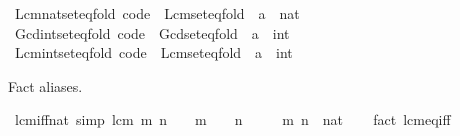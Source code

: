\begin{isabellebody}
\isamarkupfalse%
\ Lcm{\isacharunderscore}{\kern0pt}nat{\isacharunderscore}{\kern0pt}set{\isacharunderscore}{\kern0pt}eq{\isacharunderscore}{\kern0pt}fold\ {\isacharbrackleft}{\kern0pt}code{\isacharbrackright}{\kern0pt}\ {\isacharequal}{\kern0pt}\ Lcm{\isacharunderscore}{\kern0pt}set{\isacharunderscore}{\kern0pt}eq{\isacharunderscore}{\kern0pt}fold\ {\isacharbrackleft}{\kern0pt}\ {\isacharquery}{\kern0pt}{\isacharprime}{\kern0pt}a\ {\isacharequal}{\kern0pt}\ nat{\isacharbrackright}{\kern0pt}\isanewline
{}\isamarkupfalse%
\ Gcd{\isacharunderscore}{\kern0pt}int{\isacharunderscore}{\kern0pt}set{\isacharunderscore}{\kern0pt}eq{\isacharunderscore}{\kern0pt}fold\ {\isacharbrackleft}{\kern0pt}code{\isacharbrackright}{\kern0pt}\ {\isacharequal}{\kern0pt}\ Gcd{\isacharunderscore}{\kern0pt}set{\isacharunderscore}{\kern0pt}eq{\isacharunderscore}{\kern0pt}fold\ {\isacharbrackleft}{\kern0pt}\ {\isacharquery}{\kern0pt}{\isacharprime}{\kern0pt}a\ {\isacharequal}{\kern0pt}\ int{\isacharbrackright}{\kern0pt}\isanewline
{}\isamarkupfalse%
\ Lcm{\isacharunderscore}{\kern0pt}int{\isacharunderscore}{\kern0pt}set{\isacharunderscore}{\kern0pt}eq{\isacharunderscore}{\kern0pt}fold\ {\isacharbrackleft}{\kern0pt}code{\isacharbrackright}{\kern0pt}\ {\isacharequal}{\kern0pt}\ Lcm{\isacharunderscore}{\kern0pt}set{\isacharunderscore}{\kern0pt}eq{\isacharunderscore}{\kern0pt}fold\ {\isacharbrackleft}{\kern0pt}\ {\isacharquery}{\kern0pt}{\isacharprime}{\kern0pt}a\ {\isacharequal}{\kern0pt}\ int{\isacharbrackright}{\kern0pt}%
\begin{isamarkuptext}%
Fact aliases.%
\end{isamarkuptext}\isamarkuptrue%
\isamarkupfalse%
\ lcm{\isacharunderscore}{\kern0pt}{}{\isacharunderscore}{\kern0pt}iff{\isacharunderscore}{\kern0pt}nat\ {\isacharbrackleft}{\kern0pt}simp{\isacharbrackright}{\kern0pt}{\isacharcolon}{\kern0pt}\ {\isachardoublequoteopen}lcm\ m\ n\ {\isacharequal}{\kern0pt}\ {}\ {\isasymlongleftrightarrow}\ m\ {\isacharequal}{\kern0pt}\ {}\ {\isasymor}\ n\ {\isacharequal}{\kern0pt}\ {}{\isachardoublequoteclose}\isanewline
\ \ \ m\ n\ {\isacharcolon}{\kern0pt}{\isacharcolon}{\kern0pt}\ nat\isanewline
%
\isadelimproof
\ \ %
\endisadelimproof
%
\isatagproof
{}\isamarkupfalse%
\ {\isacharparenleft}{\kern0pt}fact\ lcm{\isacharunderscore}{\kern0pt}eq{\isacharunderscore}{\kern0pt}{}{\isacharunderscore}{\kern0pt}iff{\isacharparenright}{\kern0pt}%

\end{isabellebody}
